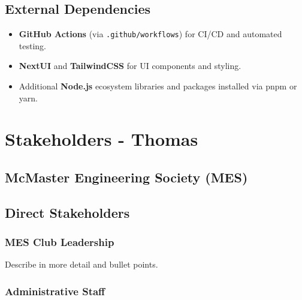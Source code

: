 \documentclass[12pt]{article}
\begin{document}
    \subsection{External Dependencies}
    \begin{itemize}
        \item \textbf{GitHub Actions} (via \texttt{.github/workflows}) for CI/CD and automated testing.
        \item \textbf{NextUI} and \textbf{TailwindCSS} for UI components and styling.
        \item Additional \textbf{Node.js} ecosystem libraries and packages installed via pnpm or yarn.
    \end{itemize}


\section{Stakeholders - Thomas}

  \subsection{McMaster Engineering Society (MES)}
  
  \subsection{Direct Stakeholders}
  
    \subsubsection{MES Club Leadership}
    Describe in more detail and bullet points.

    \subsubsection{Administrative Staff}
\end{document}
